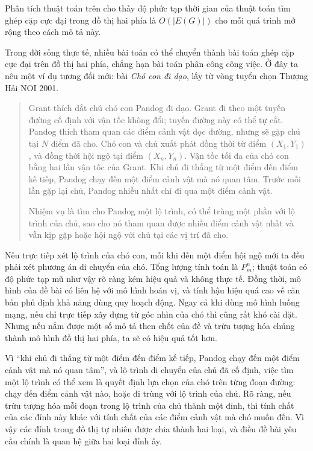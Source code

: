 \documentclass[11pt]{article}
\begin{document}
Phân tích thuật toán trên cho thấy độ phức tạp thời gian của thuật toán tìm
ghép cặp cực đại trong đồ thị hai phía là \(O(|E(G)|)\) cho mỗi quá trình
mở rộng theo cách mô tả này.

Trong đời sống thực tế, nhiều bài toán có thể chuyển thành bài toán ghép cặp
cực đại trên đồ thị hai phía, chẳng hạn bài toán phân công công việc. Ở đây
ta nêu một ví dụ tương đối mới: bài \textit{Chó con đi dạo}, lấy từ vòng
tuyển chọn Thượng Hải NOI 2001.

\begin{quote}
Grant thích dắt chú chó con Pandog đi dạo. Grant đi theo một tuyến đường cố
định với vận tốc không đổi; tuyến đường này có thể tự cắt. Pandog thích tham
quan các điểm cảnh vật dọc đường, nhưng sẽ gặp chủ tại \(N\) điểm đã cho.
Chó con và chủ xuất phát đồng thời từ điểm \((X_1,Y_1)\), và đồng thời hội
ngộ tại điểm \((X_n,Y_n)\). Vận tốc tối đa của chó con bằng hai lần vận tốc
của Grant. Khi chủ đi thẳng từ một điểm đến điểm kế tiếp, Pandog chạy đến
một điểm cảnh vật mà nó quan tâm. Trước mỗi lần gặp lại chủ, Pandog nhiều
nhất chỉ đi qua một điểm cảnh vật.

Nhiệm vụ là tìm cho Pandog một lộ trình, có thể trùng một phần với lộ trình
của chủ, sao cho nó tham quan được nhiều điểm cảnh vật nhất và vẫn kịp gặp
hoặc hội ngộ với chủ tại các vị trí đã cho.
\end{quote}

Nếu trực tiếp xét lộ trình của chó con, mỗi khi đến một điểm hội ngộ mới ta
đều phải xét phương án di chuyển của chó. Tổng lượng tính toán là
\(P_m^n\); thuật toán có độ phức tạp mũ như vậy rõ ràng kém hiệu quả và
không thực tế. Đồng thời, mô hình của đề bài có liên hệ với mô hình hoán vị,
và tính hậu hiệu quá cao về căn bản phủ định khả năng dùng quy hoạch động.
Ngay cả khi dùng mô hình luồng mạng, nếu chỉ trực tiếp xây dựng từ góc nhìn
của chó thì cũng rất khó cài đặt. Nhưng nếu nắm được một số mô tả then chốt
của đề và trừu tượng hóa chúng thành mô hình đồ thị hai phía, ta sẽ có hiệu
quả tốt hơn.

Vì ``khi chủ đi thẳng từ một điểm đến điểm kế tiếp, Pandog chạy đến một điểm
cảnh vật mà nó quan tâm'', và lộ trình di chuyển của chủ đã cố định, việc tìm
một lộ trình có thể xem là quyết định lựa chọn của chó trên từng đoạn đường:
chạy đến điểm cảnh vật nào, hoặc đi trùng với lộ trình của chủ. Rõ ràng, nếu
trừu tượng hóa mỗi đoạn trong lộ trình của chủ thành một đỉnh, thì tính chất
của các đỉnh này khác với tính chất của các điểm cảnh vật mà chó muốn đến.
Vì vậy các đỉnh trong đồ thị tự nhiên được chia thành hai loại, và điều đề
bài yêu cầu chính là quan hệ giữa hai loại đỉnh ấy.
\end{document}
